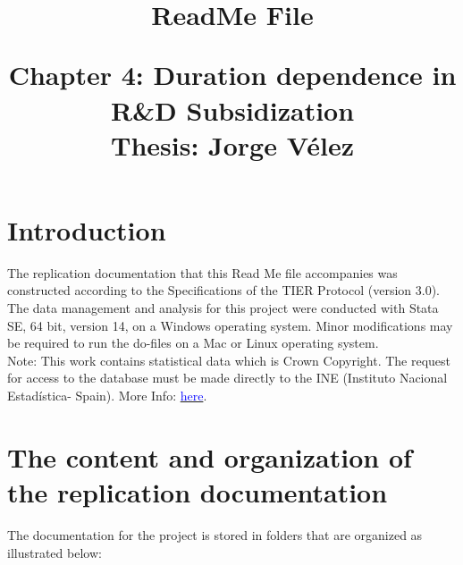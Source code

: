 \documentclass[12pt,a4paper]{article}
\begin{document}
	
\title{
\textbf{ReadMe File} \\
\begin{large}
Chapter 4: Duration dependence in R\&D Subsidization\\
Thesis: Jorge Vélez\\
\end{large} }
\maketitle

\section{Introduction}


The replication documentation that this Read Me file accompanies was constructed according to the Specifications of the TIER Protocol (version 3.0).
The data management and analysis for this project were conducted with Stata SE, 64 bit, version 14, on a Windows operating system.  Minor modifications may be required to run the do-files on a Mac or Linux operating system.\\

Note: This work contains statistical data which is Crown Copyright. The request for access to the database must be made directly to the INE (Instituto Nacional Estadística- Spain). More Info: \href{http://www.ine.es/dyngs/INEbase/en/operacion.htm?c=Estadistica\_C\&cid=1254736176755\&menu=resultados\&secc=1254736195616\&idp=1254735576669}{\textcolor{blue}{here}}.  

\section{The content and organization of the replication documentation}

The documentation for the project is stored in folders that are organized as illustrated below:
\end{document}
